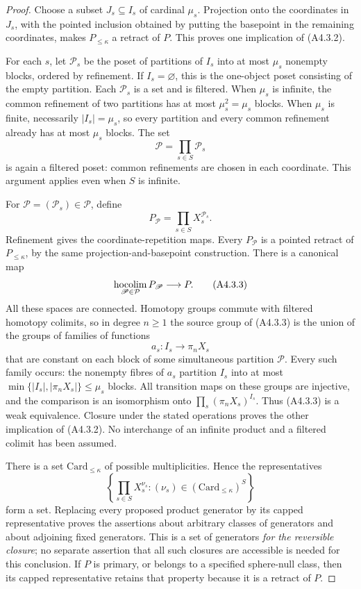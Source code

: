 \begin{proof}
Choose a subset $J_s\subseteq I_s$ of cardinal $\mu_s$.  Projection
onto the coordinates in $J_s$, with the pointed inclusion obtained by
putting the basepoint in the remaining coordinates, makes
$P_{\leq\kappa}$ a retract of $P$.  This proves one implication of
\textup{(A4.3.2)}.

For each $s$, let $\mathcal P_s$ be the poset of partitions of $I_s$
into at most $\mu_s$ nonempty blocks, ordered by refinement.  If
$I_s=\varnothing$, this is the one-object poset consisting of the
empty partition.  Each $\mathcal P_s$ is a set and is filtered.  When
$\mu_s$ is infinite, the common refinement of two partitions has at
most $\mu_s^2=\mu_s$ blocks.  When $\mu_s$ is finite, necessarily
$|I_s|=\mu_s$, so every partition and every common refinement already
has at most $\mu_s$ blocks.  The set
\[
                    \mathcal P=\prod_{s\in S}\mathcal P_s
\]
is again a filtered poset: common refinements are chosen in each
coordinate.  This argument applies even when $S$ is infinite.

For $\mathscr P=(\mathscr P_s)\in\mathcal P$, define
\[
                 P_{\mathscr P}
                    =\prod_{s\in S}X_s^{\mathscr P_s}.
\]
Refinement gives the coordinate-repetition maps.  Every
$P_{\mathscr P}$ is a pointed retract of $P_{\leq\kappa}$, by the
same projection-and-basepoint construction.  There is a canonical map
\[
        \operatorname*{hocolim}_{\mathscr P\in\mathcal P}P_{\mathscr P}
                  \longrightarrow P.
 \tag{A4.3.3}
\]
All these spaces are connected.  Homotopy groups commute with filtered
homotopy colimits, so in degree $n\geq1$ the source group of
\textup{(A4.3.3)} is the union of the groups of families of functions
\[
       a_s:I_s\longrightarrow\pi_nX_s
\]
that are constant on each block of some simultaneous partition
$\mathscr P$.  Every such family occurs: the nonempty fibres of
$a_s$ partition $I_s$ into at most
$\min\{|I_s|,|\pi_nX_s|\}\leq\mu_s$ blocks.  All transition maps
on these groups are injective, and the comparison is an isomorphism
onto $\prod_s(\pi_nX_s)^{I_s}$.  Thus \textup{(A4.3.3)} is a weak
equivalence.  Closure under the stated operations proves the other
implication of \textup{(A4.3.2)}.  No interchange of an infinite
product and a filtered colimit has been assumed.

There is a set $\mathrm{Card}_{\leq\kappa}$ of possible multiplicities.
Hence the representatives
\[
 \left\{\prod_{s\in S}X_s^{\nu_s}:
           (\nu_s)\in(\mathrm{Card}_{\leq\kappa})^S\right\}
 \tag{A4.3.4}
\]
form a set.  Replacing every proposed product generator by its capped
representative proves the assertions about arbitrary classes of
generators and about adjoining fixed generators.  This is a set of
generators \emph{for the reversible closure}; no separate assertion
that all such closures are accessible is needed for this conclusion.
If $P$ is primary, or belongs to a specified sphere-null class, then
its capped representative retains that property because it is a
retract of $P$.


\end{proof}
